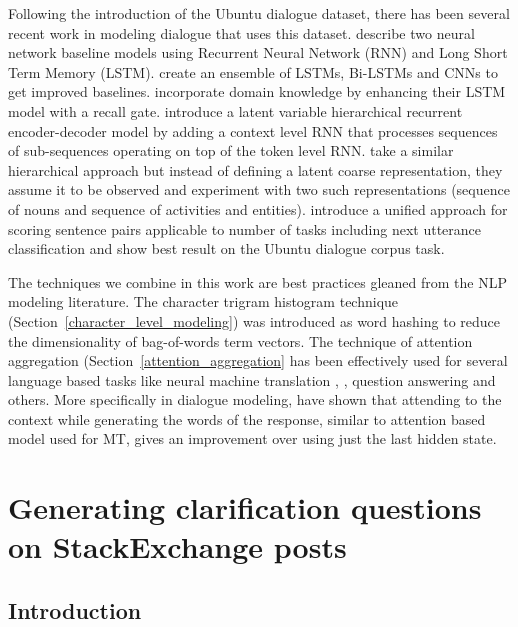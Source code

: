 \documentclass[11pt]{report}
\renewcommand\cite{\citep}	%
\begin{document}
Following the introduction of the Ubuntu dialogue dataset, there has been several recent work in modeling dialogue that uses this dataset. \cite{lowe2015ubuntu} describe two neural network baseline models using Recurrent Neural Network (RNN) and Long Short Term Memory (LSTM). 
\cite{kadlec2015improved} create an ensemble of LSTMs, Bi-LSTMs and CNNs to get improved baselines. 
\cite{xu2016incorporating} incorporate domain knowledge by enhancing their LSTM model with a recall gate.
\cite{serban2016hierarchical} introduce a latent variable hierarchical recurrent encoder-decoder model by adding a context level RNN that processes sequences of sub-sequences operating on top of the token level RNN.
\cite{serban2016multiresolution} take a similar hierarchical approach but instead of defining a latent coarse representation, they assume it to be observed and experiment with two such representations (sequence of nouns and sequence of activities and entities).
\cite{baudivs2016sentence} introduce a unified approach for scoring sentence pairs applicable to number of tasks including next utterance classification and show best result on the Ubuntu dialogue corpus task. 

The techniques we combine in this work are best practices gleaned from the NLP modeling literature. 
The character trigram histogram technique (Section~\ref{character_level_modeling}) was introduced as word hashing \cite{huang2013learning} to reduce the dimensionality of bag-of-words term vectors. The technique of attention aggregation (Section~\ref{attention_aggregation} has been effectively used for several language based tasks like neural machine translation \cite{bahdanau2014neural}, \cite{luong2015effective}, question answering \cite{} and others. More specifically in dialogue modeling, \cite{yao2016attentional} have shown that attending to the context while generating the words of the response, similar to attention based model used for MT, gives an improvement over using just the last hidden state.


\newpage

\chapter{Generating clarification questions on StackExchange posts}\label{stackexchange}

\section{Introduction}\label{introduction}
\end{document}
